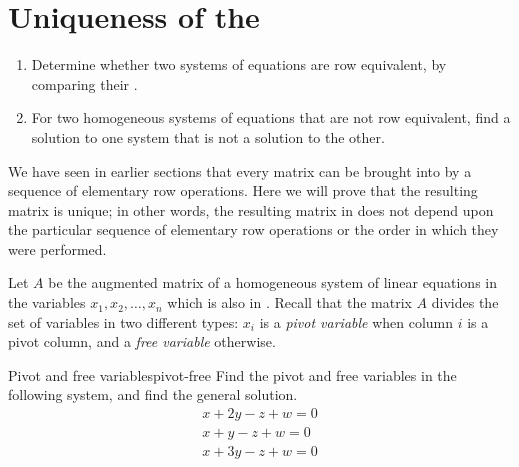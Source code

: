 \section{Uniqueness of the {\rref}}

\begin{outcome}
  \begin{enumerate}
  \item Determine whether two systems of equations are row equivalent,
    by comparing their {\rref}.
  \item For two homogeneous systems of equations that are not row
    equivalent, find a solution to one system that is not a solution
    to the other.
  \end{enumerate}
\end{outcome}

We have seen in earlier sections that every matrix can be brought into
{\rref} by a sequence of elementary row operations. Here we will prove
that the resulting matrix is unique; in other words, the resulting
matrix in {\rref} does not depend upon the particular sequence of
elementary row operations or the order in which they were performed.

Let $A$ be the augmented matrix of a homogeneous system of linear
equations in the variables $x_1, x_2,\ldots, x_n$ which is also in
{\rref}. Recall that the matrix $A$ divides the set of variables in
two different types: $x_i$ is a {\em pivot variable}%
 when column $i$ is a pivot column, and a {\em
  free variable}%
 otherwise.

\begin{example}{Pivot and free variables}{pivot-free}
  Find the pivot and free variables in the following system, and find
  the general solution.
  \begin{equation*}
    \begin{array}{c}
      x+2y-z+w=0 \\
      x+y-z+w=0 \\
      x+3y-z+w=0
    \end{array}
  \end{equation*}
\end{example}

